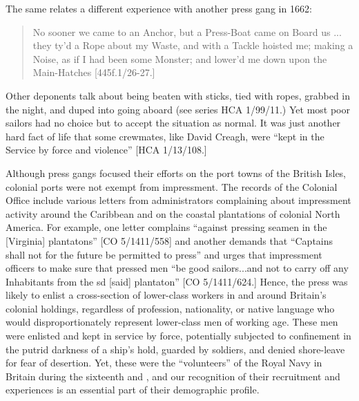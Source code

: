 The same  relates a different experience with another press gang in 1662:

\begin{quotation}
No sooner we came to an Anchor, but a Press-Boat came on Board us ... they ty’d a Rope about my Waste, and with a Tackle hoisted me; making a Noise, as if I had been some Monster; and lower’d me down upon the Main-Hatches [445f.1/26-27.]\end{quotation}

Other deponents talk about being beaten with sticks, tied with ropes, grabbed in the night, and duped into going aboard (see series HCA 1/99/11.) Yet most poor sailors had no choice but to accept the situation as normal. It was just another hard fact of life that some crewmates, like  David Creagh, were “kept in the Service by force and violence” [HCA 1/13/108.] 

  Although press gangs focused their efforts on the port towns of the British Isles, colonial ports were not exempt from impressment. The records of the Colonial Office include various letters from administrators complaining about impressment activity around the Caribbean and on the coastal plantations of colonial North America. For example, one letter complains “against pressing seamen in the [Virginia] plantatons” [CO 5/1411/558] and another demands that “Captains shall not for the future be permitted to press” and urges that impressment officers to make sure that pressed men “be good sailors...and not to carry off any Inhabitants from the sd [said] plantaton” [CO 5/1411/624.] Hence, the press was likely to enlist a cross-section of lower-class workers in and around Britain’s colonial holdings, regardless of profession, nationality, or native language who would disproportionately represent lower-class men of working age. These men were enlisted and kept in service by force, potentially subjected to confinement in the putrid darkness of a ship’s hold, guarded by soldiers, and denied shore-leave for fear of desertion. Yet, these were the “volunteers” of the Royal Navy in Britain during the sixteenth and , and our recognition of their recruitment and experiences is an essential part of their demographic profile.  

